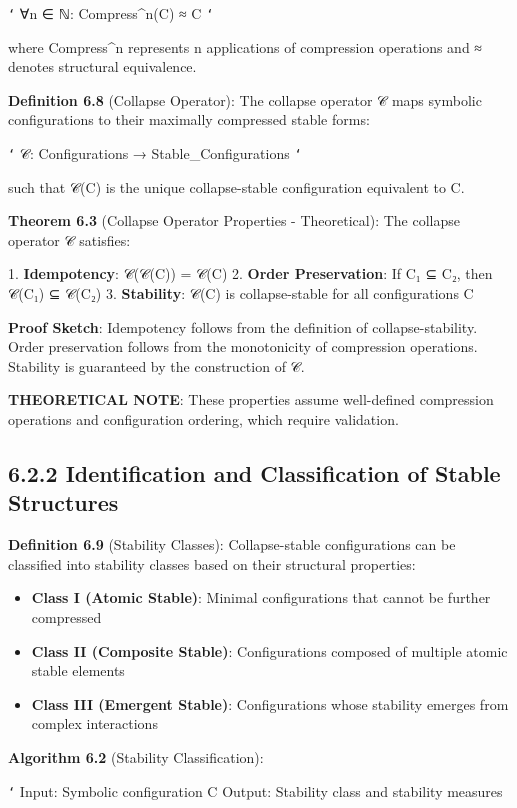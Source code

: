 \texttt{`}
∀n ∈ ℕ: Compress^n(C) ≈ C
\texttt{`}

where Compress^n represents n applications of compression operations and ≈ denotes structural equivalence.

\textbf{Definition 6.8} (Collapse Operator): The collapse operator 𝒞 maps symbolic configurations to their maximally compressed stable forms:

\texttt{`}
𝒞: Configurations → Stable_Configurations
\texttt{`}

such that 𝒞(C) is the unique collapse-stable configuration equivalent to C.

\textbf{Theorem 6.3} (Collapse Operator Properties - Theoretical): The collapse operator 𝒞 satisfies:

1. \textbf{Idempotency}: 𝒞(𝒞(C)) = 𝒞(C)
2. \textbf{Order Preservation}: If C₁ ⊆ C₂, then 𝒞(C₁) ⊆ 𝒞(C₂)
3. \textbf{Stability}: 𝒞(C) is collapse-stable for all configurations C

\textbf{Proof Sketch}: Idempotency follows from the definition of collapse-stability. Order preservation follows from the monotonicity of compression operations. Stability is guaranteed by the construction of 𝒞.

\textbf{THEORETICAL NOTE}: These properties assume well-defined compression operations and configuration ordering, which require validation.

\subsection{6.2.2 Identification and Classification of Stable Structures}

\textbf{Definition 6.9} (Stability Classes): Collapse-stable configurations can be classified into stability classes based on their structural properties:

\begin{itemize}
\item \textbf{Class I (Atomic Stable)}: Minimal configurations that cannot be further compressed
\item \textbf{Class II (Composite Stable)}: Configurations composed of multiple atomic stable elements
\item \textbf{Class III (Emergent Stable)}: Configurations whose stability emerges from complex interactions
\end{itemize}

\textbf{Algorithm 6.2} (Stability Classification):

\texttt{`}
Input: Symbolic configuration C
Output: Stability class and stability measures

